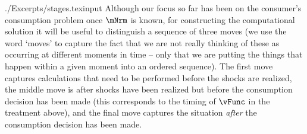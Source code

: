 \documentclass[titlepage, headings=optiontotocandhead]{\econtex}
\providecommand{\move}{move}\renewcommand{\move}{move}
\providecommand{\moves}{moves}\renewcommand{\moves}{moves}
\begin{document}
\unskip
\begin{verbatimwrite}{./Excerpts/stages.texinput}  Although our focus so far has been on the consumer's consumption problem once $\mNrm$ is known, for constructing the computational solution it will be useful to distinguish a sequence of three {\moves} (we use the word `\moves' to capture the fact that we are not really thinking of these as occurring at different moments in time -- only that we are putting the things that happen within a given moment into an ordered sequence).  The first {\move} captures calculations that need to be performed before the shocks are realized, the middle {\move} is after shocks have been realized but before the consumption decision has been made (this corresponds to the timing of $\vFunc$ in the treatment above), and the final {\move} captures the situation \textit{after} the consumption decision has been made.
\end{verbatimwrite}

\end{document}
